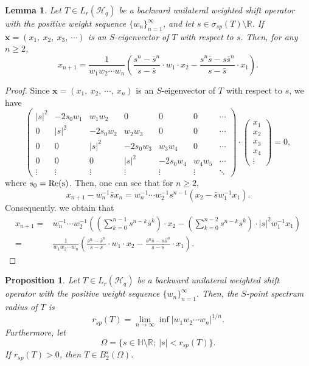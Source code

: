 \documentclass[pdflatex,sn-mathphys-num]{sn-jnl}%
\theoremstyle{thmstyleone}%
\newtheorem{proposition}[theorem]{Proposition}%
\theoremstyle{thmstyletwo}%
\theoremstyle{thmstylethree}%
\newtheorem{lemma}{Lemma}%
\newtheorem{lemma}[theorem]{Lemma}
\newtheorem{proposition}[theorem]{Proposition}
\theoremstyle{definition}
\theoremstyle{remark}
\begin{document}
\begin{lemma}\label{BUSEV}
Let $T\in L_r(\mathcal{H}_q)$ be a backward unilateral weighted shift operator with the positive weight sequence $\{w_n\}_{n=1}^{\infty}$, and let $s\in\sigma_{sp}(T)\setminus\mathbb{R}$.  If $\boldsymbol{x}=(x_1,\ x_2,\ x_3,\ \cdots)$ is an $S$-eigenvector of $T$ with respect to $s$. Then, for any $n\geq 2$,
\[
x_{n+1}=
\frac{1}{w_1w_2\cdots w_n}\left(\frac{s^n-\bar{s}^n}{s-\bar{s}}\cdot w_1\cdot x_2-\frac{s^n\bar{s}-s\bar{s}^n}{s-\bar{s}}\cdot x_1\right).
\]
\end{lemma}
    \begin{proof}
    Since $\boldsymbol{x}=(x_1,\ x_2,\ \cdots,\ x_n)$ is an $S$-eigenvector of $T$ with respect to $s$, we have
    \[
    \begin{pmatrix}
|s|^2 & -2s_0w_1 & w_1w_2 & 0 & 0 & 0 &  \cdots \\
0 & |s|^2 & -2s_0w_2 & w_2w_3 & 0 & 0 & \cdots \\
0 & 0 & |s|^2 & -2s_0w_3 & w_3w_4 & 0 & \cdots \\
0 & 0 & 0 & |s|^2 & -2s_0w_4 & w_4w_5 & \cdots \\
\vdots & \vdots & \vdots & \vdots & \vdots & \vdots & \ddots
\end{pmatrix}
\cdot
\begin{pmatrix}
x_1 \\
x_2 \\
x_3 \\
x_4 \\
\vdots
\end{pmatrix}
=0,
\]
where $s_0=\rm{Re}(s)$. Then, one can see that for $n\geq 2$,
\begin{equation*}\label{eq9}
x_{n+1}-w_n^{-1}\bar{s}x_n=w_{n}^{-1}\cdots w_2
^{-1}s^{n-1}(x_2-\bar{s}w_1^{-1}x_1).
\end{equation*}
Consequently. we obtain that
\[
\begin{aligned}
x_{n+1}=&w_{n}^{-1}\cdots w_2
^{-1}\left((\sum\limits_{k=0}^{n-1}s^{n-k}\bar{s}^{k})\cdot x_2-(\sum\limits_{k=0}^{n-2}s^{n-k}\bar{s}^{k})\cdot|s|^2w_1^{-1}x_1 \right)\\
= & \frac{1}{w_1w_2\cdots w_n}\left(\frac{s^n-\bar{s}^n}{s-\bar{s}}\cdot w_1\cdot x_2-\frac{s^n\bar{s}-s\bar{s}^n}{s-\bar{s}}\cdot x_1\right).
\end{aligned}
\]
    \end{proof}


\begin{proposition}\label{SPR}
Let $T\in L_r(\mathcal{H}_q)$ be a backward unilateral weighted shift operator with the positive weight sequence $\{w_n\}_{n=1}^{\infty}$. Then,
the $S$-point spectrum radius of $T$ is
\[
r_{sp}(T)=\lim\limits_{n\to\infty}\inf |w_{1}w_{2}\cdots w_{n}|^{{1}/{n}}.
\]
Furthermore, let
\[
\Omega=\{s\in\mathbb{H}\setminus\mathbb{R};\ |s|<r_{sp}(T)\}.
\]
If $r_{sp}(T)>0$, then $T\in B_2^{s}(\Omega)$.
\end{proposition}
\end{document}
